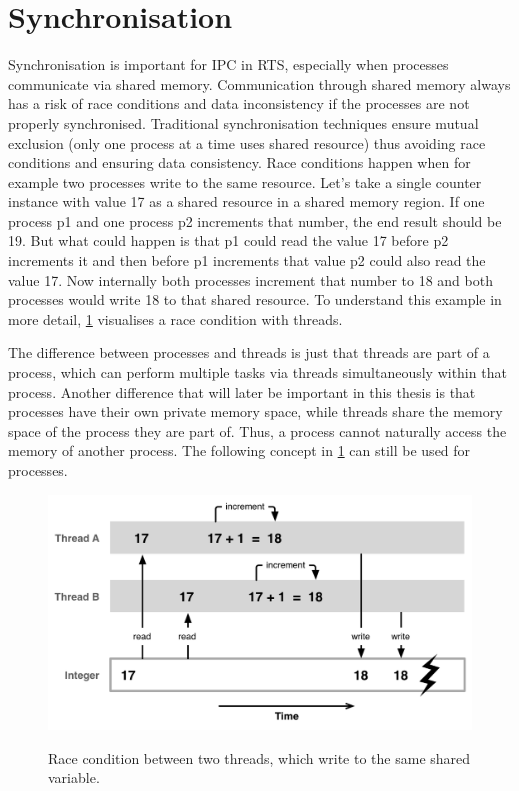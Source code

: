 \section{Synchronisation}\label{sec:synchronization}

Synchronisation is important for \ac{IPC} in \ac{RTS}, especially when processes communicate via shared memory. Communication through shared memory always has a risk of race conditions and data inconsistency if the processes are not properly synchronised. Traditional synchronisation techniques ensure mutual exclusion (only one process at a time uses shared resource) thus avoiding race conditions and ensuring data consistency. Race conditions happen when for example two processes write to the same resource. Let's take a single counter instance with value 17 as a shared resource in a shared memory region. If one process p1 and one process p2 increments that number, the end result should be 19. But what could happen is that p1 could read the value 17 before p2 increments it and then before p1 increments that value p2 could also read the value 17. Now internally both processes increment that number to 18 and both processes would write 18 to that shared resource. To understand this example in more detail, \cref{fig:race-condition} visualises a race condition with threads. 

The difference between processes and threads is just that threads are part of a process, which can perform multiple tasks via threads simultaneously within that process. Another difference that will later be important in this thesis is that processes have their own private memory space, while threads share the memory space of the process they are part of. Thus, a process cannot naturally access the memory of another process. The following concept in \cref{fig:race-condition} can still be used for processes. \cite{processesVSthreads}

\begin{figure}[!ht]
    \centering
    \captionsetup{justification=centering}
    \caption{Race condition between two threads, which write to the same shared variable.}
    \includegraphics[width=115mm]{images/race-condition.png}
    \cite{Race-Condition}
    \label{fig:race-condition}
\end{figure}

